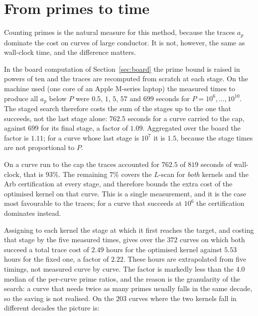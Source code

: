 \documentclass[11pt]{amsart}
\theoremstyle{remark}
\theoremstyle{definition}
\begin{document}

\BoardTrend{} \BoardDetail

\section{From primes to time}
\label{sec:time}

Counting primes is the natural measure for this method, because the traces $a_p$ dominate the
cost on curves of large conductor. It is not, however, the same as wall-clock time, and the
difference matters.

In the board computation of Section~\ref{sec:board} the prime bound is raised in powers of ten and
the traces are recomputed from scratch at each stage. On the machine used (one core of an Apple
M-series laptop) the measured times to produce all $a_p$ below $P$ were $0.5$, $1$, $5$, $57$ and
$699$ seconds for $P=10^6,\dots,10^{10}$. The staged search therefore costs the sum of the stages up
to the one that succeeds, not the last stage alone: $762.5$ seconds for a curve carried to the cap,
against $699$ for its final stage, a factor of $1.09$. Aggregated over the board the factor is
$1.11$; for a curve whose last stage is $10^7$ it is $1.5$, because the stage times are not
proportional to $P$.

On a curve run to the cap the traces accounted for $762.5$ of $819$ seconds of wall-clock, that is
$93\%$. The remaining $7\%$ covers the $L$-scan for \emph{both} kernels and the Arb certification at
every stage, and therefore bounds the extra cost of the optimised kernel on that curve. This is a
single measurement, and it is the case most favourable to the traces; for a curve that succeeds at
$10^6$ the certification dominates instead.

Assigning to each kernel the stage at which it first reaches the target, and costing that stage by
the five measured times, gives over the $372$ curves on which both succeed a total trace cost of
$2.49$ hours for the optimised kernel against $5.53$ hours for the fixed one, a factor of $2.22$.
These hours are extrapolated from five timings, not measured curve by curve. The factor is markedly
less than the $4.0$ median of the per-curve prime ratios, and the reason is the granularity of the
search: a curve that needs twice as many primes usually falls in the same decade, so the saving is
not realised. On the $203$ curves where the two kernels fall in different decades the picture is:
\end{document}
